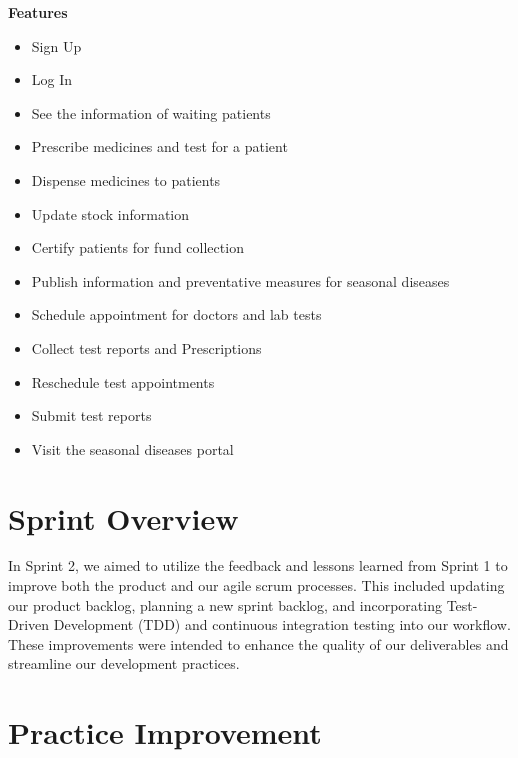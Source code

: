 \documentclass[a4paper,12pt]{article}
\begin{document}
\textbf{Features}
\begin{itemize}
    \item Sign Up
    \item Log In
    \item See the information of waiting patients
    \item Prescribe medicines and test for a patient
    \item Dispense medicines to patients
    \item Update stock information
    \item Certify patients for fund collection
    \item Publish information and preventative measures for seasonal diseases
    \item Schedule appointment for doctors and lab tests
    \item Collect test reports and Prescriptions
    \item Reschedule test appointments
    \item Submit test reports
    \item Visit the seasonal diseases portal
\end{itemize}
\section{Sprint Overview}
In Sprint 2, we aimed to utilize the feedback and lessons learned from Sprint 1 to improve both the product
and our agile scrum processes. This included updating our product backlog, planning a new sprint backlog, and
incorporating Test-Driven Development (TDD) and continuous integration testing into our workflow. These
improvements were intended to enhance the quality of our deliverables and streamline our development
practices.
\section{Practice Improvement}
\end{document}

